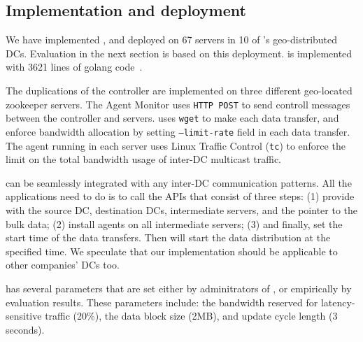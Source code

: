 \subsection{Implementation and deployment}
\label{sec:deployment}

We have implemented \name {}, and deployed on 67 servers in 10 of
\company's geo-distributed DCs. Evaluation in the next section is
based on this deployment. \name is implemented with 3621 lines of
golang code~\cite{golang}.

The duplications of the controller are implemented on three different
geo-located zookeeper servers. The Agent Monitor uses \texttt{HTTP
POST} to send controll messages between the controller and servers.
\name uses \texttt{wget} to make each data transfer, and enforce
bandwidth allocation by setting \texttt{--limit-rate} field in each
data transfer. The agent running in each server uses Linux Traffic
Control (\texttt{tc}) to enforce the limit on the total bandwidth
usage of inter-DC multicast traffic.

\name can be seamlessly integrated with any inter-DC communication
patterns. All the applications need to do is to call the \name APIs
that consist of three steps: (1) provide \name with the source DC,
destination DCs, intermediate servers, and the pointer to the bulk
data; (2) install agents on all intermediate servers; (3) and
finally, set the start time of the data transfers. Then \name will
start the data distribution at the specified time. We speculate that
our implementation should be applicable to other companies' DCs too.

\name has several parameters that are set either by adminitrators of
\company, or empirically by evaluation results. These parameters
include: the bandwidth reserved for latency-sensitive traffic (20\%),
the data block size (2MB), and update cycle length (3 seconds). 

